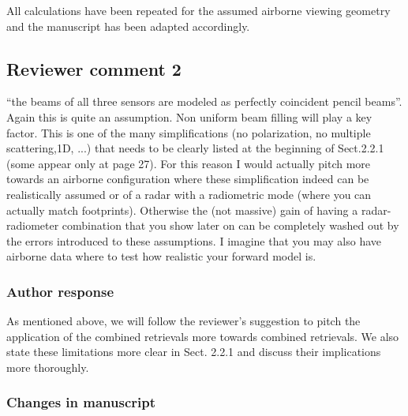 All calculations have been repeated for the assumed airborne viewing geometry
and the manuscript has been adapted accordingly.

\subsection*{Reviewer comment 2}

 “the beams of all three sensors are modeled as perfectly coincident pencil
beams”. Again this is quite an assumption. Non uniform beam filling will play a
key factor. This is one of the many simplifications (no polarization, no multiple
scattering,1D, ...) that needs to be clearly listed at the beginning of
Sect.2.2.1 (some appear only at page 27). For this reason I would actually pitch
more towards an airborne configuration where these simplification indeed can
be realistically assumed or of a radar with a radiometric mode (where you can
actually match footprints). Otherwise the (not massive) gain of having a
radar-radiometer combination that you show later on can be completely washed
out by the errors introduced to these assumptions. I imagine that you may also
have airborne data where to test how realistic your forward model is.

\subsubsection*{Author response}


As mentioned above, we will follow the reviewer's suggestion to pitch the
application of the combined retrievals more towards combined retrievals. We also
state these limitations more clear in Sect. 2.2.1 and discuss their implications
more thoroughly.

\subsubsection{Changes in manuscript}

